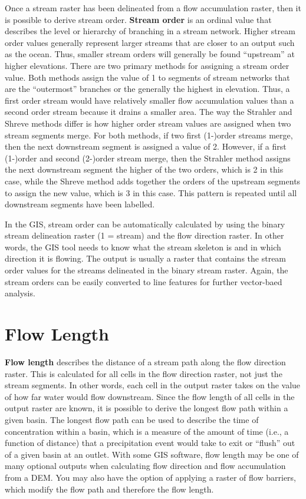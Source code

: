 \documentclass[
]{book}
\begin{document}
Once a stream raster has been delineated from a flow accumulation raster, then it is possible to derive stream order. \textbf{Stream order} is an ordinal value that describes the level or hierarchy of branching in a stream network. Higher stream order values generally represent larger streams that are closer to an output such as the ocean. Thus, smaller stream orders will generally be found ``upstream'' at higher elevations. There are two primary methods for assigning a stream order value. Both methods assign the value of 1 to segments of stream networks that are the ``outermost'' branches or the generally the highest in elevation. Thus, a first order stream would have relatively smaller flow accumulation values than a second order stream because it drains a smaller area. The way the Strahler \citep{strahler1957quantitative} and Shreve \citep{shreve1966statistical} methods differ is how higher order stream values are assigned when two stream segments merge. For both methods, if two first (1-)order streams merge, then the next downstream segment is assigned a value of 2. However, if a first (1-)order and second (2-)order stream merge, then the Strahler method assigns the next downstream segment the higher of the two orders, which is 2 in this case, while the Shreve method adds together the orders of the upstream segments to assign the new value, which is 3 in this case. This pattern is repeated until all downstream segments have been labelled.

In the GIS, stream order can be automatically calculated by using the binary stream delineation raster (1 = stream) and the flow direction raster. In other words, the GIS tool needs to know what the stream skeleton is and in which direction it is flowing. The output is usually a raster that contains the stream order values for the streams delineated in the binary stream raster. Again, the stream orders can be easily converted to line features for further vector-baed analysis.

\hypertarget{flow-length}{%
\section{Flow Length}\label{flow-length}}

\textbf{Flow length} describes the distance of a stream path along the flow direction raster. This is calculated for all cells in the flow direction raster, not just the stream segments. In other words, each cell in the output raster takes on the value of how far water would flow downstream. Since the flow length of all cells in the output raster are known, it is possible to derive the longest flow path within a given basin. The longest flow path can be used to describe the time of concentration within a basin, which is a measure of the amount of time (i.e., a function of distance) that a precipitation event would take to exit or ``flush'' out of a given basin at an outlet. With some GIS software, flow length may be one of many optional outputs when calculating flow direction and flow accumulation from a DEM. You may also have the option of applying a raster of flow barriers, which modify the flow path and therefore the flow length.
\end{document}
